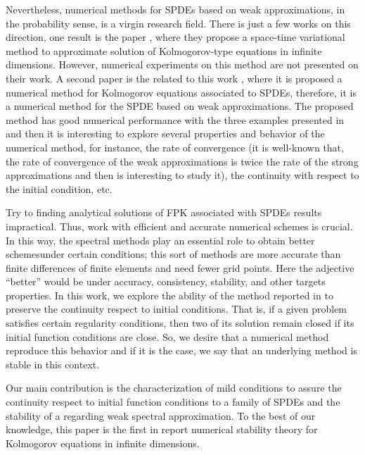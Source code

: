 \documentclass[]{interact}
\theoremstyle{plain}%
\theoremstyle{definition}
\theoremstyle{remark}
\begin{document}
        Nevertheless, numerical methods for SPDEs based on weak approximations, 
    in the probability sense, is a virgin research field.  There is just a
    few works on this direction, one result is the paper
    \cite{schwab2013adaptive}, where they propose a space-time variational
    method to approximate solution of Kolmogorov-type equations in infinite
    dimensions. However, numerical experiments on this method are not
    presented on their work. A second paper is the related to this work
    \cite{de-fl}, where it is proposed a numerical method for Kolmogorov
    equations associated to SPDEs, therefore, it is a numerical method for
    the SPDE based on weak approximations. The proposed method has good
    numerical performance with the three examples presented in \cite{de-fl}
    and then it is interesting to explore several properties and behavior
    of the numerical method, for instance, the rate of convergence (it is
    well-known that, the rate of convergence of the weak approximations is
    twice the rate of the strong approximations and then is interesting to
    study it), the continuity with respect to the initial condition, etc.
    
        Try to finding analytical solutions of FPK associated with SPDEs results
    impractical. Thus, work with efficient and accurate numerical schemes is 
    crucial. In this way, the spectral methods play an essential role to obtain 
    better schemes\textemdash under certain conditions; this sort of methods 
    are  more accurate than finite differences of finite elements and need 
    fewer grid points. Here the adjective ``better'' would be under accuracy, 
    consistency, stability, and other targets properties. In this work, we 
    explore the ability of the method reported in \cite{de-fl} to preserve the 
    continuity respect to initial conditions. That is, if a given problem 
    satisfies certain regularity conditions, then two of its solution remain 
    closed if its initial function conditions are close. So, we desire that a 
    numerical method reproduce this 
    behavior and if it is the case, we say that an underlying method is stable 
    in this context.
    
        Our main contribution is the characterization of mild conditions to
    assure the continuity respect to initial function conditions to a family of
    SPDEs and the stability of a regarding weak spectral approximation. 
    To the best of our knowledge, this paper is the first in report numerical 
    stability theory for Kolmogorov equations in infinite dimensions.
    
\end{document}
